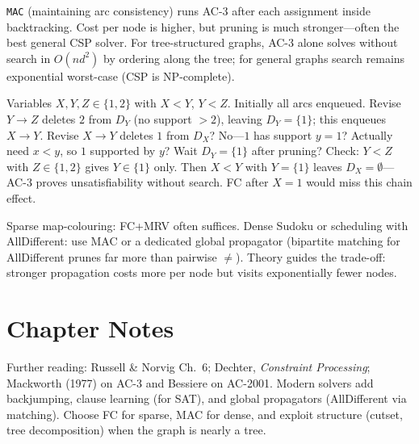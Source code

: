 \texttt{MAC} (maintaining arc consistency) runs AC-3 after each assignment inside backtracking. Cost per node is higher, but pruning is much stronger---often the best general CSP solver. For tree-structured graphs, AC-3 alone solves without search in $O(nd^2)$ by ordering along the tree; for general graphs search remains exponential worst-case (CSP is NP-complete).

\begin{example}[AC-3 on a chain]
Variables $X,Y,Z\in\{1,2\}$ with $X<Y$, $Y<Z$. Initially all arcs enqueued. Revise $Y\to Z$ deletes $2$ from $D_Y$ (no support $>2$), leaving $D_Y=\{1\}$; this enqueues $X\to Y$. Revise $X\to Y$ deletes $1$ from $D_X$? No---$1$ has support $y=1$? Actually need $x<y$, so $1$ supported by $y$? Wait $D_Y=\{1\}$ after pruning? Check: $Y<Z$ with $Z\in\{1,2\}$ gives $Y\in\{1\}$ only. Then $X<Y$ with $Y=\{1\}$ leaves $D_X=\emptyset$---AC-3 proves unsatisfiability without search. FC after $X=1$ would miss this chain effect.
\end{example}

\begin{remark}
Sparse map-colouring: FC+MRV often suffices. Dense Sudoku or scheduling with AllDifferent: use MAC or a dedicated global propagator (bipartite matching for AllDifferent prunes far more than pairwise $\neq$). Theory guides the trade-off: stronger propagation costs more per node but visits exponentially fewer nodes.
\end{remark}

\section{Chapter Notes}
Further reading: Russell \& Norvig Ch.~6; Dechter, \emph{Constraint Processing}; Mackworth (1977) on AC-3 and Bessiere on AC-2001. Modern solvers add backjumping, clause learning (for SAT), and global propagators (AllDifferent via matching). Choose FC for sparse, MAC for dense, and exploit structure (cutset, tree decomposition) when the graph is nearly a tree.

